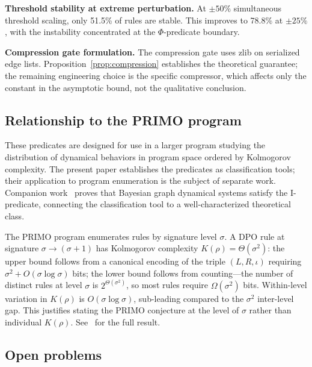 \documentclass{../shared/primo}
\begin{document}
\textbf{Threshold stability at extreme perturbation.} At $\pm 50\%$ simultaneous threshold scaling, only 51.5\% of rules are stable. This improves to 78.8\% at $\pm 25\%$, with the instability concentrated at the $\Phi$-predicate boundary.

\textbf{Compression gate formulation.} The compression gate uses zlib on serialized edge lists. Proposition~\ref{prop:compression} establishes the theoretical guarantee; the remaining engineering choice is the specific compressor, which affects only the constant in the asymptotic bound, not the qualitative conclusion.

\subsection{Relationship to the PRIMO program}

These predicates are designed for use in a larger program studying the distribution of dynamical behaviors in program space ordered by Kolmogorov complexity. The present paper establishes the predicates as classification tools; their application to program enumeration is the subject of separate work. Companion work~\cite{kowalczyk2026bayesian} proves that Bayesian graph dynamical systems satisfy the I-predicate, connecting the classification tool to a well-characterized theoretical class.

\begin{remark}
The PRIMO program enumerates rules by signature level $\sigma$. A DPO rule at signature $\sigma \to (\sigma{+}1)$ has Kolmogorov complexity $K(\rho) = \Theta(\sigma^2)$: the upper bound follows from a canonical encoding of the triple $(L, R, \iota)$ requiring $\sigma^2 + O(\sigma \log \sigma)$ bits; the lower bound follows from counting---the number of distinct rules at level $\sigma$ is $2^{\Theta(\sigma^2)}$, so most rules require $\Omega(\sigma^2)$ bits. Within-level variation in $K(\rho)$ is $O(\sigma \log \sigma)$, sub-leading compared to the $\sigma^2$ inter-level gap. This justifies stating the PRIMO conjecture at the level of $\sigma$ rather than individual $K(\rho)$. See~\cite{kowalczyk2026hierarchy} for the full result.
\end{remark}

\subsection{Open problems}
\end{document}
